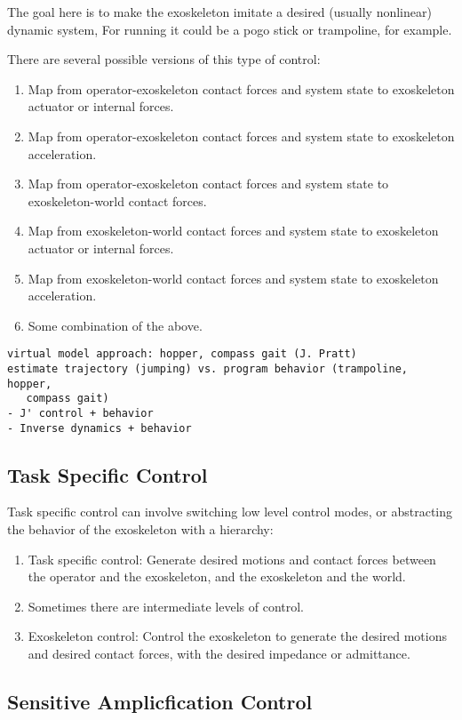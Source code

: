 \documentclass[letterpaper,12pt,fullpage]{article}
\begin{document}
The goal here is to make the exoskeleton imitate a desired (usually nonlinear)
dynamic system,
For running it could be a pogo stick or trampoline, for example.

There are several possible versions of this type of control:
\begin{enumerate}
\item
Map from operator-exoskeleton contact forces and system state
to exoskeleton actuator or internal forces.
\item
Map from operator-exoskeleton contact forces and system state
to exoskeleton acceleration.
\item
Map from operator-exoskeleton contact forces and system state
to exoskeleton-world contact forces.
\item
Map from exoskeleton-world contact forces and system state to exoskeleton actuator or internal forces.
\item
Map from exoskeleton-world contact forces and system state to exoskeleton acceleration.
\item
Some combination of the above.
\end{enumerate}

\begin{verbatim}
virtual model approach: hopper, compass gait (J. Pratt)
estimate trajectory (jumping) vs. program behavior (trampoline, hopper,
   compass gait)
- J' control + behavior
- Inverse dynamics + behavior
\end{verbatim}

\subsection{Task Specific Control}

Task specific control can involve switching low level control modes, or abstracting
the behavior of the exoskeleton with a hierarchy:
\begin{enumerate}
\item
Task specific control: Generate desired motions and contact forces between
the operator and the exoskeleton, and the exoskeleton and the world.
\item
Sometimes there are intermediate levels of control.
\item
Exoskeleton control: Control the exoskeleton to generate the desired motions and
desired contact forces, with the desired impedance or admittance.
\end{enumerate}

\subsection{Sensitive Amplicfication Control}
\end{document}
